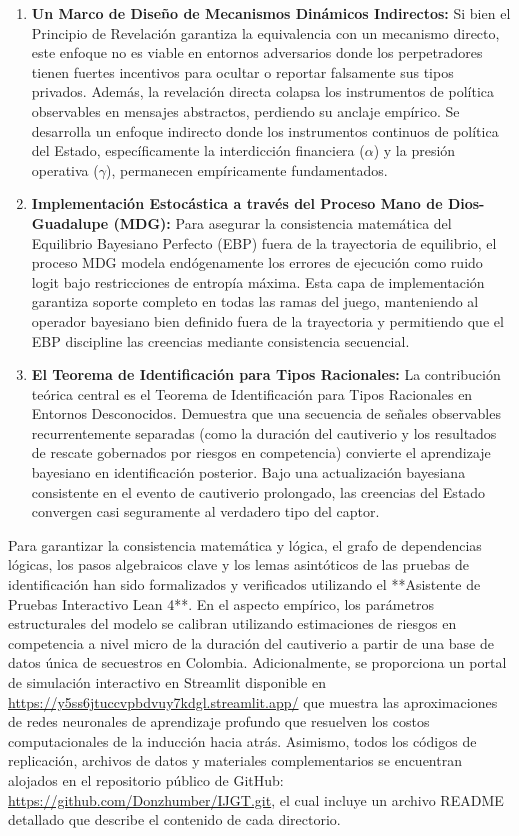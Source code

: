 \documentclass[12pt]{article}
\begin{document}
\begin{enumerate}
    \item \textbf{Un Marco de Diseño de Mecanismos Dinámicos Indirectos:} Si bien el Principio de Revelación garantiza la equivalencia con un mecanismo directo, este enfoque no es viable en entornos adversarios donde los perpetradores tienen fuertes incentivos para ocultar o reportar falsamente sus tipos privados. Además, la revelación directa colapsa los instrumentos de política observables en mensajes abstractos, perdiendo su anclaje empírico. Se desarrolla un enfoque indirecto donde los instrumentos continuos de política del Estado, específicamente la interdicción financiera ($\alpha$) y la presión operativa ($\gamma$), permanecen empíricamente fundamentados.
    
    \item \textbf{Implementación Estocástica a través del Proceso Mano de Dios-Guadalupe (MDG):} Para asegurar la consistencia matemática del Equilibrio Bayesiano Perfecto (EBP) fuera de la trayectoria de equilibrio, el proceso MDG modela endógenamente los errores de ejecución como ruido logit bajo restricciones de entropía máxima. Esta capa de implementación garantiza soporte completo en todas las ramas del juego, manteniendo al operador bayesiano bien definido fuera de la trayectoria y permitiendo que el EBP discipline las creencias mediante consistencia secuencial.
    
    \item \textbf{El Teorema de Identificación para Tipos Racionales:} La contribución teórica central es el Teorema de Identificación para Tipos Racionales en Entornos Desconocidos. Demuestra que una secuencia de señales observables recurrentemente separadas (como la duración del cautiverio y los resultados de rescate gobernados por riesgos en competencia) convierte el aprendizaje bayesiano en identificación posterior. Bajo una actualización bayesiana consistente en el evento de cautiverio prolongado, las creencias del Estado convergen casi seguramente al verdadero tipo del captor.
\end{enumerate}

Para garantizar la consistencia matemática y lógica, el grafo de dependencias lógicas, los pasos algebraicos clave y los lemas asintóticos de las pruebas de identificación han sido formalizados y verificados utilizando el **Asistente de Pruebas Interactivo Lean 4**. En el aspecto empírico, los parámetros estructurales del modelo se calibran utilizando estimaciones de riesgos en competencia a nivel micro de la duración del cautiverio a partir de una base de datos única de secuestros en Colombia. Adicionalmente, se proporciona un portal de simulación interactivo en Streamlit disponible en \url{https://y5ss6jtuccvpbdvuy7kdgl.streamlit.app/} que muestra las aproximaciones de redes neuronales de aprendizaje profundo que resuelven los costos computacionales de la inducción hacia atrás. Asimismo, todos los códigos de replicación, archivos de datos y materiales complementarios se encuentran alojados en el repositorio público de GitHub: \url{https://github.com/Donzhumber/IJGT.git}, el cual incluye un archivo README detallado que describe el contenido de cada directorio.
\end{document}

